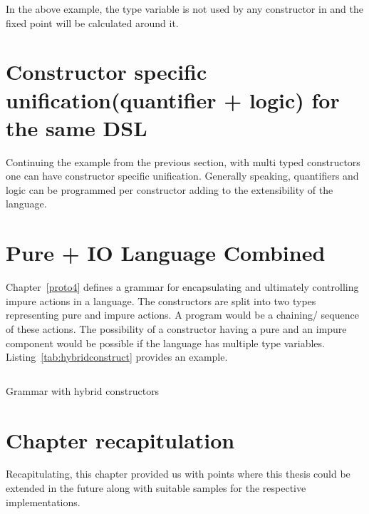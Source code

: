 \documentclass[thesis-solanki.tex]{subfiles}
\begin{document}
In the above example, the  type variable is not used by any constructor in  and the fixed 
point will be calculated around it. 

\section{Constructor specific unification(quantifier + logic) for the same DSL}
Continuing the example from the previous section, with multi typed constructors one can have constructor specific unification. Generally 
speaking, quantifiers and logic can be programmed per constructor adding to the extensibility of the language.   

\section{Pure + IO Language Combined}
Chapter~\ref{proto4} defines a grammar for encapsulating and ultimately controlling impure actions in a language. The constructors are split
into two types representing pure and impure actions. A program would be a chaining/ sequence of these actions. The possibility of a 
constructor having a pure and an impure component would be possible if the language has multiple type variables. 
Listing~\ref{tab:hybridconstruct} provides an example.


\begin{code-list}[H]
\begin{singlespace}
\inputminted{haskell}{haskell-proto4-hybrid-construct.hs}
\end{singlespace}
\caption{Grammar with hybrid constructors}
\label{tab:hybridconstruct}
\end{code-list}

\section{Chapter recapitulation}
Recapitulating, this chapter provided us with points where this thesis could be extended in the future along with suitable samples for the
respective implementations.


\ifMain
\begin{scope}
  \nolinenumbers
  \enotesize
  \par
  \begin{singlespace}
  \setlength{\parskip}{12pt plus 2pt minus 1pt}
  \theendnotes
  \par
  \end{singlespace}
\end{scope}
\fi
\end{document}
